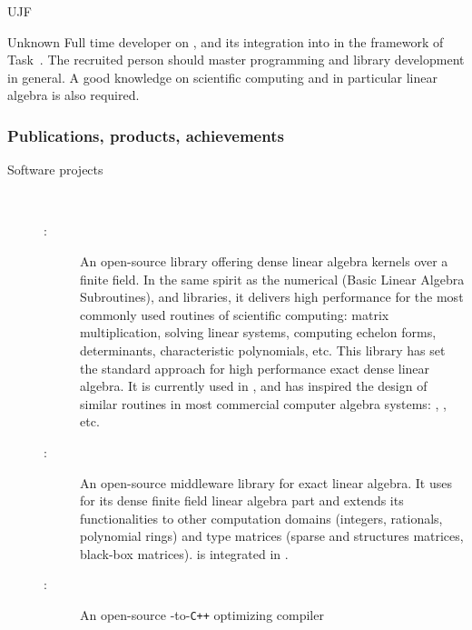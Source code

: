 \begin{sitedescription}{UJF}
\begin{participant}[type=res,PM=24,salary=4200,gender=]{Unknown}
Full time developer on \Linbox, and its integration into \Sage in the framework
of Task~. The recruited
person should master  programming and library development in general. A good
knowledge on scientific computing and in particular linear algebra is also required. 
\end{participant}

\subsubsection*{Publications, products, achievements}

\begin{description}
\item[Software projects]\
  \begin{description}
 \item[:] An open-source  library offering dense
    linear algebra kernels over a finite field. In the same  spirit as the
    numerical \software{BLAS} (Basic Linear Algebra Subroutines), and
    \software{LAPACK} libraries, it delivers high performance for the most
    commonly used routines of scientific computing: matrix multiplication,
    solving linear systems, computing echelon forms, determinants,
    characteristic polynomials, etc. This library has set the standard
    approach for high performance exact dense linear algebra. It is currently
    used in \Sage, and has inspired the design of similar routines in
    most commercial computer algebra systems: \Maple, \Magma, etc.
  \item[\Linbox:] An open-source \software{C++} middleware library for
    exact linear algebra. It uses \software{fflas-ffpack} for its dense finite
    field linear algebra part and extends its functionalities to other
    computation domains (integers, rationals, polynomial rings) and type
    matrices (sparse and structures matrices, black-box
    matrices). \Linbox is integrated in \Sage. 
  \item[\Pythran:] \label{pythran-descr}An open-source \Python-to-\texttt{C++} optimizing compiler

\end{description}
\end{description}
\end{sitedescription}
